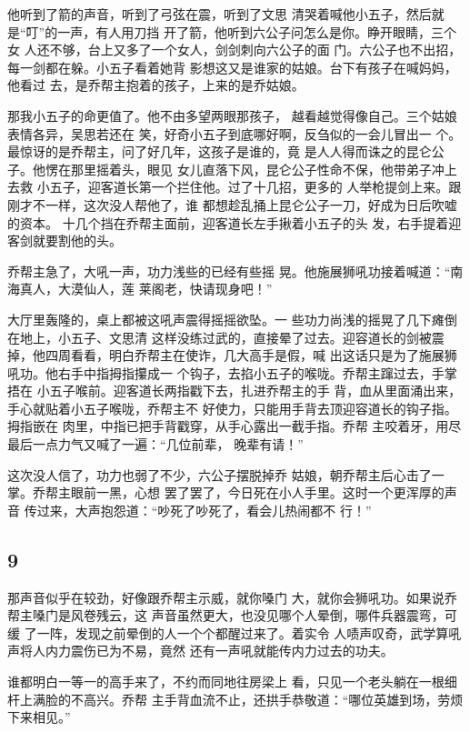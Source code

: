 他听到了箭的声音，听到了弓弦在震，听到了文思
清哭着喊他小五子，然后就是“叮”的一声，有人用刀挡
开了箭，他听到六公子问怎么是你。睁开眼睛，三个女
人还不够，台上又多了一个女人，剑剑刺向六公子的面
门。六公子也不出招，每一剑都在躲。小五子看着她背
影想这又是谁家的姑娘。台下有孩子在喊妈妈，他看过
去，是乔帮主抱着的孩子，上来的是乔姑娘。

那我小五子的命更值了。他不由多望两眼那孩子，
越看越觉得像自己。三个姑娘表情各异，吴思若还在
笑，好奇小五子到底哪好啊，反刍似的一会儿冒出一
个。最惊讶的是乔帮主，问了好几年，这孩子是谁的，竟
是人人得而诛之的昆仑公子。他愣在那里摇着头，眼见
女儿直落下风，昆仑公子性命不保，他带弟子冲上去救
小五子，迎客道长第一个拦住他。过了十几招，更多的
人举枪提剑上来。跟刚才不一样，这次没人帮他了，谁
都想趁乱捅上昆仑公子一刀，好成为日后吹嘘的资本。
十几个挡在乔帮主面前，迎客道长左手揪着小五子的头
发，右手提着迎客剑就要割他的头。

乔帮主急了，大吼一声，功力浅些的已经有些摇
晃。他施展狮吼功接着喊道：“南海真人，大漠仙人，莲
莱阁老，快请现身吧！”

大厅里轰隆的，桌上都被这吼声震得摇摇欲坠。一
些功力尚浅的摇晃了几下瘫倒在地上，小五子、文思清
这样没练过武的，直接晕了过去。迎容道长的剑被震
掉，他四周看看，明白乔帮主在使诈，几大高手是假，喊
出这话只是为了施展狮吼功。他右手中指拇指攥成一
个钩子，去掐小五子的喉咙。乔帮主蹿过去，手掌捂在
小五子喉前。迎客道长两指戳下去，扎进乔帮主的手
背，血从里面涌出来，手心就贴着小五子喉咙，乔帮主不
好使力，只能用手背去顶迎容道长的钩子指。拇指嵌在
肉里，中指已把手背戳穿，从手心露出一截手指。乔帮
主咬着牙，用尽最后一点力气又喊了一遍：“几位前辈，
晚辈有请！”

这次没人信了，功力也弱了不少，六公子摆脱掉乔
姑娘，朝乔帮主后心击了一掌。乔帮主眼前一黑，心想
罢了罢了，今日死在小人手里。这时一个更浑厚的声音
传过来，大声抱怨道：“吵死了吵死了，看会儿热闹都不
行！”
\newline

{\centering\subsection{9}}

那声音似乎在较劲，好像跟乔帮主示威，就你嗓门
大，就你会狮吼功。如果说乔帮主嗓门是风卷残云，这
声音虽然更大，也没见哪个人晕倒，哪件兵器震弯，可缓
了一阵，发现之前晕倒的人一个个都醒过来了。着实令
人啧声叹奇，武学算吼声将人内力震伤已为不易，竟然
还有一声吼就能传内力过去的功夫。

谁都明白一等一的高手来了，不约而同地往房梁上
看，只见一个老头躺在一根细杆上满脸的不高兴。乔帮
主手背血流不止，还拱手恭敬道：“哪位英雄到场，劳烦
下来相见。”

